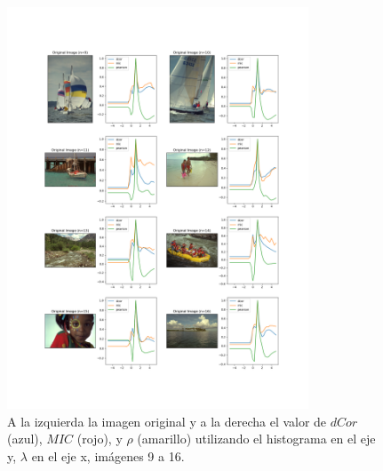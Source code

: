 \begin{figure}
    \centering
    \includegraphics[width=0.8\textwidth]{figuras/hist_comp_2.png}
    \caption{A la izquierda la imagen original y a la derecha el valor de $dCor$ (azul), $MIC$ (rojo), y $\rho$ (amarillo) utilizando el histograma en el eje y, $\lambda$ en el eje x, im\'agenes 9 a 16.}
\end{figure}


